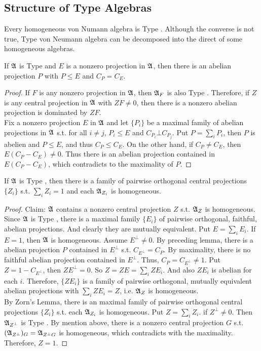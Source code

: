 \subsection{Structure of Type \texorpdfstring{}{I} Algebras}

Every homogeneous von Numann algebra is Type . Although the converse is not true, Type  von Neumann algebra can be decomposed into the direct of some homogeneous algebras.

\begin{lem}
	If $\mathfrak{A}$ is Type  and $E$ is a nonzero projection in $\mathfrak{A}$, then there is an abelian projection $P$ with $P \leqslant E$ and $C_P = C_E$.
\end{lem}
\begin{proof}
	If $F$ is any nonzero projection in $\mathfrak{A}$, then $\mathfrak{A}_F$ is also Type . Therefore, if $Z$ is any central projection in $\mathfrak{A}$ with $ZF \neq 0$, then there is a nonzero abelian projection is dominated by $ZF$.\\
	Fix a nonzero projection $E$ in $\mathfrak{A}$ and let $\{P_i\}$ be a maximal family of abelian projections in $\mathfrak{A}$ s.t. for all $i \neq j$, $P_i \leqslant E$ and $C_{P_i} \bot C_{P_j}$. Put $P = \sum_i P_i$, then $P$ is abelien and $P \leqslant E$, and thus $C_P \leqslant C_E$. On the other hand, if $C_P \neq C_E$, then $E(C_P - C_E) \neq 0$. Thus there is an abelian projection contained in $E(C_P - C_E)$, which contradicts to the maximality of $P$.
\end{proof}

\begin{thm}
	If $\mathfrak{A}$ is Type , then there is a family of pairwise orthogonal central projections $\{Z_i\}$ s.t. $\sum_i Z_i = 1$ and each $\mathfrak{A}_{Z_i}$ is homogeneous.
\end{thm}
\begin{proof}
	Claim: $\mathfrak{A}$ contains a nonzero central projection $Z$ s.t. $\mathfrak{A}_Z$ is homogeneous. \\
	Since $\mathfrak{A}$ is Type , there is a maximal family $\{E_i\}$ of pairwise orthogonal, faithful, abelian projections. And clearly they are mutually equivalent. Put $E = \sum_i E_i$. If $E = 1$, then $\mathfrak{A}$ is homogeneous. Assume $E^{\bot} \neq 0$. By preceding lemma, there is a abelian projection $P$ contained in $E^{\bot}$ s.t. $C_{E^{\bot}} = C_P$. By maximality, there is no faithful abelian projection contained in $E^{\bot}$. Thus, $C_P = C_{E^{\bot}} \neq 1$. Put $Z = 1 - C_{E^{\bot}}$, then $ZE^{\bot} = 0$. So $Z = ZE = \sum_i ZE_i$. And also $ZE_i$ is abelian for each $i$. Therefore, $\{ZE_i\}$ is a family of pairwise orthogonal, mutually equivalent abelian projections with $\sum_i ZE_i = Z$, i.e. $\mathfrak{A}_Z$ is homogeneous.\\
	By Zorn's Lemma, there is an maximal family of pairwise orthogonal central projections $\{Z_i\}$ s.t. each $\mathfrak{A}_{Z_i}$ is homogeneous. Put $Z = \sum_i Z_i$. if $Z^{\bot} \neq 0$. Then $\mathfrak{A}_{Z^{\bot}}$ is Type . By mention above, there is a nonzero central projection $G$ s.t. $(\mathfrak{A}_{Z^{\bot}})_G = \mathfrak{A}_{{Z^{\bot}}G}$ is homogeneous, which contradicts with the maximality. Therefore, $Z = 1$.
\end{proof}

